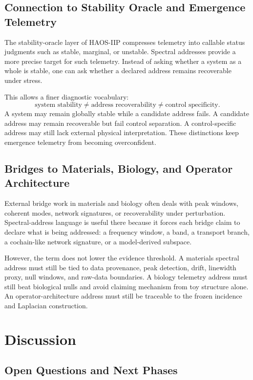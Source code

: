 \documentclass[11pt]{article}
\begin{document}
\subsection{Connection to Stability Oracle and Emergence Telemetry}

The stability-oracle layer of HAOS-IIP compresses telemetry into callable status judgments such as stable, marginal, or unstable. Spectral addresses provide a more precise target for such telemetry. Instead of asking whether a system as a whole is stable, one can ask whether a declared address remains recoverable under stress.

This allows a finer diagnostic vocabulary:
\[
\text{system stability}
\neq
\text{address recoverability}
\neq
\text{control specificity}.
\]
A system may remain globally stable while a candidate address fails. A candidate address may remain recoverable but fail control separation. A control-specific address may still lack external physical interpretation. These distinctions keep emergence telemetry from becoming overconfident.

\subsection{Bridges to Materials, Biology, and Operator Architecture}

External bridge work in materials and biology often deals with peak windows, coherent modes, network signatures, or recoverability under perturbation. Spectral-address language is useful there because it forces each bridge claim to declare what is being addressed: a frequency window, a band, a transport branch, a cochain-like network signature, or a model-derived subspace.

However, the term does not lower the evidence threshold. A materials spectral address must still be tied to data provenance, peak detection, drift, linewidth proxy, null windows, and raw-data boundaries. A biology telemetry address must still beat biological nulls and avoid claiming mechanism from toy structure alone. An operator-architecture address must still be traceable to the frozen incidence and Laplacian construction.

\section{Discussion}

\subsection{Open Questions and Next Phases}
\end{document}
